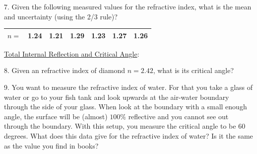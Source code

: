 7. Given the following measured values for the refractive index, what is the mean and uncertainty (using the 2/3 rule)?
\begin{table}[h]
    \centering
    \begin{tabular}{|l|l|l|l|l|l|l|}
        \hline
        $n=$ & 1.24 & 1.21 & 1.29 & 1.23 & 1.27 & 1.26 \\ \hline
    \end{tabular}
\end{table}

\noindent \underline{Total Internal Reflection and Critical Angle}: \myskip

8. Given an refractive index of diamond $n = 2.42$, what is its critical angle? \myskip

9. You want to measure the refractive index of water. For that you take a glass of water or go to your fish tank and look upwards at the air-water boundary through the side of your glass. When look at the boundary with a small enough angle, the surface will be (almost) $100\%$ reflective and you cannot see out through the boundary. With this setup, you measure the critical angle to be 60 degrees. What does this data give for the refractive index of water? Is it the same as the value you find in books?


